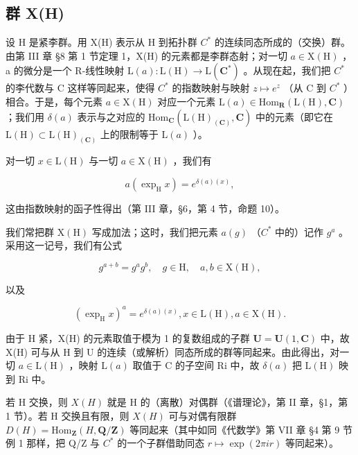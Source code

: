 \subsection{群 X(H)}

设 H 是紧李群。用 X(H) 表示从 H 到拓扑群 \(C^{*}\) 的连续同态所成的（交换）群。由第 III 章 §8 第 1 节定理 1，X(H) 的元素都是李群态射；对一切 \(a \in \mathrm{X}(\mathrm{H})\) ，a 的微分是一个 R-线性映射 \(\mathrm{L}(a) : \mathrm{L}(\mathrm{H}) \to \mathrm{L}(\mathbf{C}^{*})\) 。从现在起，我们把 \(C^{*}\) 的李代数与 C 这样等同起来，使得 \(C^{*}\) 的指数映射与映射 \(z \mapsto e^{z}\) （从 C 到 \(C^{*}\) ）相合。于是，每个元素 \(a \in \mathrm{X}(\mathrm{H})\) 对应一个元素 \(\mathrm{L}(a) \in \mathrm{Hom}_{\mathbf{R}}(\mathrm{L}(\mathrm{H}), \mathbf{C})\) ；我们用 \(\delta(a)\) 表示与之对应的 \(\mathrm{Hom}_{\mathbf{C}}(\mathrm{L}(\mathrm{H})_{(\mathbf{C})}, \mathbf{C})\) 中的元素（即它在 \(\mathrm{L}(\mathrm{H}) \subset \mathrm{L}(\mathrm{H})_{(\mathbf{C})}\) 上的限制等于 \(\mathrm{L}(a)\) ）。

对一切 \(x \in \mathrm{L}(\mathrm{H})\) 与一切 \(a \in \mathrm{X}(\mathrm{H})\) ，我们有

\[
a (\exp_ {\mathrm{H}} x) = e ^ {\delta (a) (x)},
\]

这由指数映射的函子性得出（第 III 章，§6，第 4 节，命题 10）。

我们常把群 \(\mathrm{X}(\mathrm{H})\) 写成加法；这时，我们把元素 \(a(g)\) （\(C^{*}\) 中的）记作 \(g^{a}\) 。采用这一记号，我们有公式

\[
g ^ {a + b} = g ^ {a} g ^ {b}, \quad g \in \mathrm{H}, \quad a, b \in \mathrm{X(H)},
\]

以及

\[
(\exp_ {\mathrm{H}} x) ^ {a} = e ^ {\delta (a) (x)}, x \in \mathrm{L} (\mathrm{H}), a \in \mathrm{X} (\mathrm{H}).
\]

由于 H 紧，X(H) 的元素取值于模为 1 的复数组成的子群 \(\mathbf{U} = \mathbf{U}(1, \mathbf{C})\) 中，故 X(H) 可与从 H 到 U 的连续（或解析）同态所成的群等同起来。由此得出，对一切 \(a \in \mathrm{L}(\mathrm{H})\) ，映射 \(\mathrm{L}(a)\) 取值于 C 的子空间 Ri 中，故 \(\delta(a)\) 把 \(\mathrm{L}(\mathrm{H})\) 映到 Ri 中。

若 H 交换，则 \(X(H)\) 就是 H 的（离散）对偶群（《谱理论》，第 II 章，§1，第 1 节）。若 H 交换且有限，则 \(X(H)\) 可与对偶有限群 \(D(H) = \text{Hom}_{\mathbf{Z}}(H, \mathbf{Q}/\mathbf{Z})\) 等同起来（其中如同《代数学》第 VII 章 §4 第 9 节例 1 那样，把 Q/Z 与 \(C^{*}\) 的一个子群借助同态 \(r \mapsto \exp(2\pi ir)\) 等同起来）。

